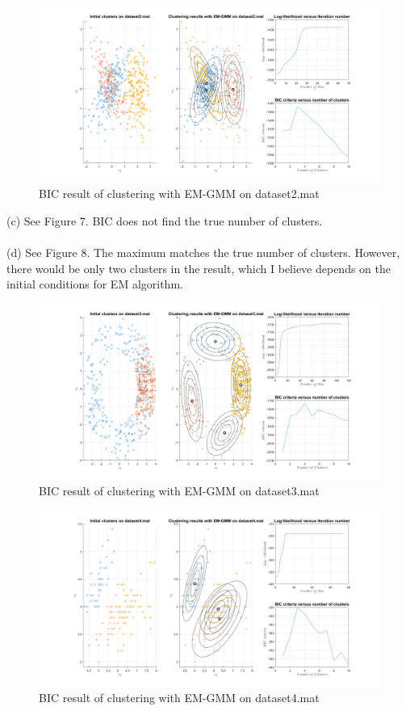 \documentclass[12pt]{article}
\begin{document}
\begin{figure}[H]
\centering
\includegraphics[width = 1\textwidth]{42b.png}
\caption{BIC result of clustering with EM-GMM on dataset2.mat}
\end{figure}
\vfill
\clearpage

\noindent(c) See Figure 7. BIC does not find the true number of clusters.\\
\\
(d) See Figure 8. The maximum matches the true number of clusters. However, there would be only two clusters in the result, which I believe depends on the initial conditions for EM algorithm.

\begin{figure}[H]
\centering
\includegraphics[width = 1\textwidth]{42c.png}
\caption{BIC result of clustering with EM-GMM on dataset3.mat}
\end{figure}

\begin{figure}[H]
\centering
\includegraphics[width = 1\textwidth]{42d.png}
\caption{BIC result of clustering with EM-GMM on dataset4.mat}
\end{figure}
\vfill
\clearpage
\end{document}
